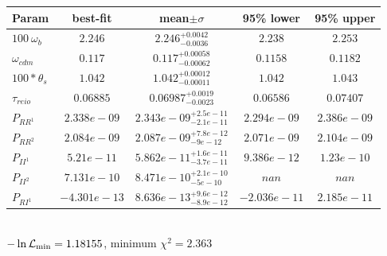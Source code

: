 \begin{tabular}{|l|c|c|c|c|} 
 \hline 
Param & best-fit & mean$\pm\sigma$ & 95\% lower & 95\% upper \\ \hline 
$100~\omega_{b }$ &$2.246$ & $2.246_{-0.0036}^{+0.0042}$ & $2.238$ & $2.253$ \\ 
$\omega_{cdm }$ &$0.117$ & $0.117_{-0.00062}^{+0.00058}$ & $0.1158$ & $0.1182$ \\ 
$100*\theta_{s }$ &$1.042$ & $1.042_{-0.00011}^{+0.00012}$ & $1.042$ & $1.043$ \\ 
$\tau_{reio }$ &$0.06885$ & $0.06987_{-0.0023}^{+0.0019}$ & $0.06586$ & $0.07407$ \\ 
$P_{{RR}^1 }$ &$2.338e-09$ & $2.343e-09_{-2.1e-11}^{+2.5e-11}$ & $2.294e-09$ & $2.386e-09$ \\ 
$P_{{RR}^2 }$ &$2.084e-09$ & $2.087e-09_{-9e-12}^{+7.8e-12}$ & $2.071e-09$ & $2.104e-09$ \\ 
$P_{{II}^1 }$ &$5.21e-11$ & $5.862e-11_{-3.7e-11}^{+1.6e-11}$ & $9.386e-12$ & $1.23e-10$ \\ 
$P_{{II}^2 }$ &$7.131e-10$ & $8.471e-10_{-5e-10}^{+2.1e-10}$ & $nan$ & $nan$ \\ 
$P_{{RI}^1 }$ &$-4.301e-13$ & $8.636e-13_{-8.9e-12}^{+9.6e-12}$ & $-2.036e-11$ & $2.185e-11$ \\ 
\hline 
 \end{tabular} \\ 
$-\ln{\cal L}_\mathrm{min} =1.18155$, minimum $\chi^2=2.363$ \\ 
